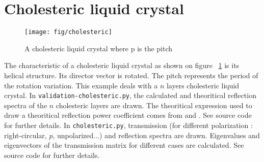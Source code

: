 \section{Cholesteric liquid crystal}
\begin{figure}[!h]
\begin{center}
\texttt{[image: fig/cholesteric]}
\end{center}
\caption{\label{fig:cholesteric}A cholesteric liquid crystal where p is the pitch}
\end{figure}
The characteristic of a cholesteric liquid crystal as shown on figure ~\ref{fig:cholesteric} is its helical structure. Its director vector is rotated. The pitch represents the period of the rotation variation.
This example deals with a $n$ layers cholesteric liquid crystal. In \verb/validation-cholesteric.py/, the calculated and theoritical reflection spectra of the $n$ cholesteric layers are drawn. The theoritical expression used to draw a theoritical reflection power coefficient comes from \cite{Yang} and \cite{Chandrasekhar}. See source code for further details. In \verb/cholesteric.py/, transmission (for different polarization : right-circular, $p$, unpolarized...) and reflection spectra are drawn. Eigenvalues and eigenvectors of the transmission matrix for different cases are calculated. See source code for further details. 


